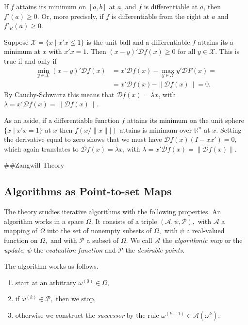\documentclass[
  12pt,
]{book}
\providecommand{\tightlist}{%
  \setlength{\itemsep}{0pt}\setlength{\parskip}{0pt}}
\begin{document}
If \(f\) attains its minimum on \([a,b]\) at \(a\),
and \(f\) is differentiable at \(a\), then \(f'(a)\geq 0\). Or, more precisely, if \(f\) is differentiable from the right at \(a\) and \(f'_R(a)\geq 0\).

Suppose \(\mathcal{X}=\{x\mid x'x\leq 1\}\) is the unit ball and a differentiable \(f\) attains its a minimum at \(x\) with \(x'x=1.\) Then \((x-y)'\mathcal{D}f(x)\geq 0\) for
all \(y\in\mathcal{X}.\) This is true if and only if
\begin{align*}
\min_{y\in\mathcal{X}}(x-y)'\mathcal{D}f(x)&=
x'\mathcal{D}f(x)-\max_{y\in\mathcal{X}}y'\mathcal{D}F(x)=\\&=x'\mathcal{D}f(x)-\|\mathcal{D}f(x)\|=0.
\end{align*}
By Cauchy-Schwartz this means that \(\mathcal{D}f(x)=\lambda x\), with \(\lambda= x'\mathcal{D}f(x)=\|\mathcal{D}f(x)\|.\)

As an aside, if a differentiable function \(f\) attains its minimum on the unit sphere \(\{x\mid x'x=1\}\) at \(x\)
then \(f(x/\|x\||)\) attains is minimum over \(\mathbb{R}^n\) at \(x\). Setting the derivative equal to zero shows that we must
have \(\mathcal{D}f(x)(I-xx')=0\), which again translates to \(\mathcal{D}f(x)=\lambda x\), with \(\lambda= x'\mathcal{D}f(x)=\|\mathcal{D}f(x)\|.\)

\#\#Zangwill Theory

\hypertarget{algorithms-as-point-to-set-maps}{%
\subsection{Algorithms as Point-to-set Maps}\label{algorithms-as-point-to-set-maps}}

The theory studies iterative algorithms with the following properties.
An algorithm works in a space \(\Omega.\) It consists of a triple \((\mathcal{A},\psi,\mathcal{P}),\)
with \(\mathcal{A}\) a mapping of \(\Omega\) into the set
of nonempty subsets of \(\Omega,\) with \(\psi\) a real-valued
function on \(\Omega,\) and with \(\mathcal{P}\) a subset of \(\Omega.\) We
call \(\mathcal{A}\) the \emph{algorithmic map} or the \emph{update}, \(\psi\) the \emph{evaluation function} and \(\mathcal{P}\) the \emph{desirable points}.

The algorithm
works as follows.

\begin{enumerate}
\def\labelenumi{\arabic{enumi}.}
\tightlist
\item
  start at an arbitrary \(\omega^{(0)}\in\Omega,\)
\item
  if \(\omega^{(k)}\in\mathcal{P},\) then we stop,
\item
  otherwise we construct the \emph{successor}
  by the rule \(\omega^{(k+1)}\in\mathcal{A}(\omega^k).\)
\end{enumerate}
\end{document}
